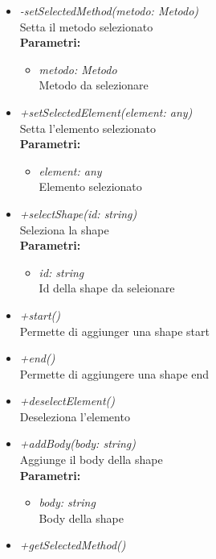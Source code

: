\begin{itemize}
\begin{itemize}
\begin{itemize}
    		\end{itemize}
    		\item \emph{-setSelectedMethod(metodo: Metodo)}\\
    		Setta il metodo selezionato\\
    		\textbf{Parametri:}
    		\begin{itemize}
    			\item \emph{metodo: Metodo}\\
    			Metodo da selezionare
    		\end{itemize}
    		\item \emph{+setSelectedElement(element: any)}\\
    		Setta l'elemento selezionato\\
    		\textbf{Parametri:}
    		\begin{itemize}
    			\item \emph{element: any}\\
    			Elemento selezionato
    		\end{itemize}
    		\item \emph{+selectShape(id: string)}\\
    		Seleziona la shape\\
    		\textbf{Parametri:}
    		\begin{itemize}
    			\item \emph{id: string}\\
    			Id della shape da seleionare
    		\end{itemize}
    		\item \emph{+start()}\\
    		Permette di aggiunger una shape start
    		\item \emph{+end()}\\
    		Permette di aggiungere una shape end
    		\item \emph{+deselectElement()}\\
    		Deseleziona l'elemento
    		\item \emph{+addBody(body: string)}\\
    		Aggiunge il body della shape\\
    		\textbf{Parametri:}
    		\begin{itemize}
    			\item \emph{body: string}\\
    			Body della shape
    		\end{itemize}
    		\item \emph{+getSelectedMethod()}\\

\end{itemize}
\end{itemize}
